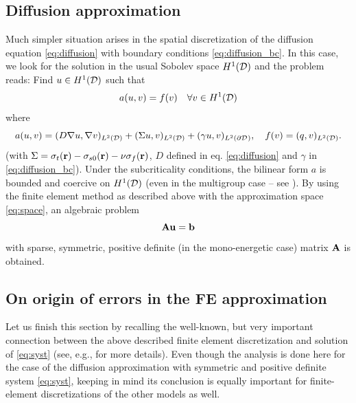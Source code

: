 \subsection{Diffusion approximation}\label{sec:diffusion_weak}

Much simpler situation arises in the spatial discretization of the diffusion equation \eqref{eq:diffusion} with boundary
conditions \eqref{eq:diffusion_bc}. In this case, we look for the solution in the usual Sobolev space $H^1(\VV)$ and the
problem reads: Find $u\in H^1(\VV)$ such that
\begin{equation}\label{eq:dif_bil_ex}
	a(u,v) = f(v)	\quad	\forall v\in H^1(\VV)
\end{equation}
where 
$$ 
	a(u,v) = (D\nabla u, \nabla v)_{\Lp[2](\VV)} + (\Sigma u, v)_{\Lp[2](\VV)} + (\gamma u, v)_{\Lp[2](\pV)},\quad
	f(v) = (q,v)_{\Lp[2](\VV)}.
$$
(with $\Sigma = \sigma_t(\br) - \sigma_{s0}(\br)  - \nu\sigma_f(\br)$, $D$ defined in eq. \eqref{eq:diffusion} and
$\gamma$ in \eqref{eq:diffusion_bc}).
Under the subcriticality conditions, the bilinear form $a$ is bounded and coercive on $H^1(\VV)$ (even in the multigroup
case -- see \cite[Chap. VII]{DautrayLions2}). By using the finite element method as described
above with the approximation space \eqref{eq:space}, an algebraic problem
\begin{equation}\label{eq:syst}
	\mat{A}\mat{u} = \mat{b}
\end{equation}
with sparse, symmetric, positive definite (in the mono-energetic case) matrix $\mat{A}$ is obtained.


\subsection{On origin of errors in the FE approximation}
Let us finish this section by recalling the well-known, but very important connection between the above described finite
element discretization and solution of \eqref{eq:syst} (see, e.g., \cite{Arilie} for more details). Even though the
analysis is done here for the case of the diffusion approximation with symmetric and positive definite system
\eqref{eq:syst}, keeping in mind its conclusion is equally important for finite-element discretizations of the other
models as well.

